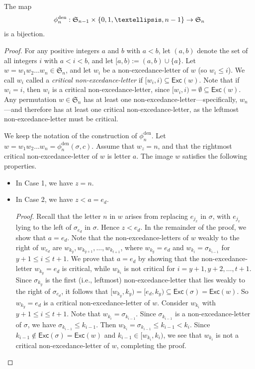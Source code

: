 \documentclass[10pt,a4paper]{amsart}
\begin{document}
\begin{lemma}\label{lemma:bijection}
The map 
$$\phi_{n}^{\emph{\text{den}}}: \mathfrak{S}_{n-1}\times\{0,1,\ldots,n-1\}\rightarrow\mathfrak{S}_{n}
$$
is a bijection.
\end{lemma}	

\begin{proof}
For any positive integers $a$ and $b$ with $a<b$, 
let $(a,b)$ denote the set of all integers $i$ with $a<i<b$, and let $[a, b):=(a, b)\cup\{a\}$.
Let $w=w_{1}w_{2}\ldots w_{n}\in\mathfrak{S}_{n}$,
and let $w_{i}$ be a non-excedance-letter of $w$ 
(so $w_{i}\leq i$).
We call $w_{i}$ called a 
\emph{critical non-excedance-letter} if $[w_{i},i)\subseteq \textsf{Exc}(w)$.
Note that if $w_{i}=i$, then $w_{i}$ is a critical non-excedance-letter,
since $[w_{i},i)=\emptyset\subseteq \textsf{Exc}(w)$.
Any permutation $w\in\mathfrak{S}_{n}$ has at least one non-excedance-letter---specifically, $w_{n}$---and therefore has at least one critical non-excedance-letter, 
as the leftmost non-excedance-letter must be critical.

We keep the notation of the construction of $\phi_{n}^{\text{den}}$.
Let $w=w_{1}w_{2}\ldots w_{n}=\phi_{n}^{\text{den}}(\sigma,c)$. 
Assume that $w_{z}=n$, and that the rightmost critical non-excedance-letter of $w$ is letter $a$.
The image $w$ satisfies the following properties.

\begin{itemize}
\item[$\bullet$] In Case 1, we have $z=n$.

\item[$\bullet$] In Case 2, we have $z<a=e_{d}$.

\emph{Proof.} 
Recall that the letter $n$ in $w$ arises from replacing  $e_{j_{x}}$ in $\sigma$, 
with $e_{j_{x}}$ lying to the left of $\sigma_{e_{d}}$ in $\sigma$.
Hence $z<e_{d}$. 
In the remainder of the proof, we show that $a=e_{d}$.
Note that the non-excedance-letters of $w$ weakly to the right  of  $w_{e_{d}}$ are $w_{k_{y}},w_{k_{y+1}},\ldots,w_{k_{t+1}}$,
where $w_{k_{y}}=e_{d}$ and $w_{k_{i}}=\sigma_{k_{i-1}}$ for $y+1\leq i\leq t+1$.
We prove that $a=e_{d}$ by showing that the non-excedance-letter $w_{k_{y}}=e_{d}$ is critical, while $w_{k_{i}}$ is not critical for $i=y+1,y+2,\ldots,t+1$.
Since $\sigma_{k_{y}}$ is the first (i.e., leftmost) non-excedance-letter that lies weakly to the right of $\sigma_{e_{d}}$,
it follows that $[w_{k_{y}},k_{y})=[e_{d},k_{y})\subseteq\textsf{Exc}(\sigma)=\textsf{Exc}(w)$.
So $w_{k_{y}}=e_{d}$ is a critical non-excedance-letter of $w$.
Consider $w_{k_{i}}$ with $y+1\leq i\leq t+1$.
Note that $w_{k_{i}}=\sigma_{k_{i-1}}$.
Since $\sigma_{k_{i-1}}$ is a non-excedance-letter of $\sigma$,
we have $\sigma_{k_{i-1}}\leq k_{i-1}$.
Then $w_{k_{i}}=\sigma_{k_{i-1}}\leq k_{i-1}<k_{i}$.
Since $k_{i-1}\notin\textsf{Exc}(\sigma)=\textsf{Exc}(w)$ and $k_{i-1}\in[w_{k_{i}},k_{i})$,
we see that $w_{k_{i}}$ is not a critical non-excedance-letter of $w$,
completing the proof.


\end{itemize}
\end{proof}
\end{document}
